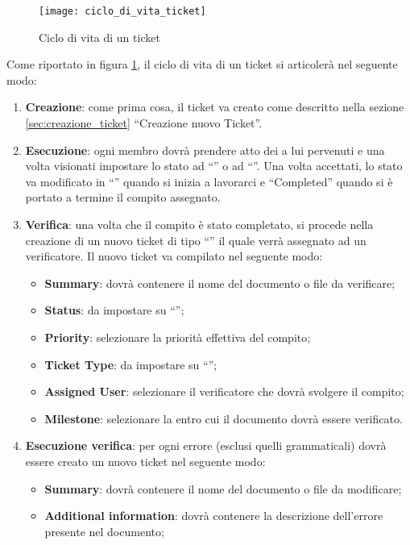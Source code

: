 \begin{figure}[h]
\centering
\texttt{[image: ciclo\_di\_vita\_ticket]}
\caption{Ciclo di vita di un ticket} \label{fig:ciclo_di_vita_ticket}
\end{figure}
Come riportato in figura \ref{fig:ciclo_di_vita_ticket}, il ciclo di vita di un ticket si articolerà nel seguente modo:
\begin{enumerate}
\item \textbf{Creazione}: come prima cosa, il ticket va creato come descritto nella sezione \ref{sec:creazione_ticket} ``Creazione nuovo Ticket''.
\item \textbf{Esecuzione}: ogni membro dovrà prendere atto dei  a lui pervenuti e una volta visionati impostare lo stato ad ``'' o ad ``''. Una volta accettati, lo stato va modificato in ``'' quando si inizia a lavorarci e ``Completed'' quando si è portato a termine il compito assegnato.
\item \textbf{Verifica}: una volta che il compito è stato completato, si procede nella creazione di un nuovo ticket di tipo ``'' il quale verrà assegnato ad un verificatore. Il nuovo ticket va compilato nel seguente modo:
\begin{itemize}
\item \textbf{Summary}: dovrà contenere il nome del documento o file da verificare;
\item \textbf{Status}: da impostare su ``'';
\item \textbf{Priority}: selezionare la priorità effettiva del compito;
\item \textbf{Ticket Type}: da impostare su ``'';
\item \textbf{Assigned User}: selezionare il verificatore che dovrà svolgere il compito;
\item \textbf{Milestone}: selezionare la  entro cui il documento dovrà essere verificato.
\end{itemize}
\item \textbf{Esecuzione verifica}: per ogni errore (esclusi quelli grammaticali) dovrà essere creato un nuovo ticket nel seguente modo:
\begin{itemize}
\item \textbf{Summary}: dovrà contenere il nome del documento o file da modificare;
\item \textbf{Additional information}: dovrà contenere la descrizione dell'errore presente nel documento;

\end{itemize}
\end{enumerate}
